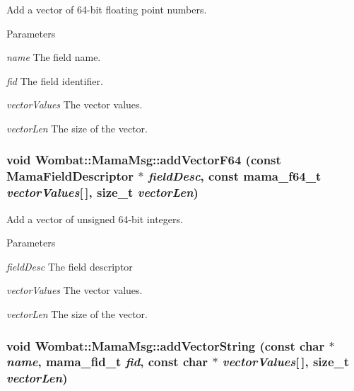 Add a vector of 64-\/bit floating point numbers. 
\begin{DoxyParams}{Parameters}
\item[{\em name}]The field name. \item[{\em fid}]The field identifier. \item[{\em vectorValues}]The vector values. \item[{\em vectorLen}]The size of the vector. \end{DoxyParams}
\hypertarget{classWombat_1_1MamaMsg_abe5aa90f4e89a99826528c5f11120455}{
\subsubsection[{addVectorF64}]{\setlength{\rightskip}{0pt plus 5cm}void Wombat::MamaMsg::addVectorF64 (const {\bf MamaFieldDescriptor} $\ast$ {\em fieldDesc}, \/  const mama\_\-f64\_\-t {\em vectorValues}\mbox{[}$\,$\mbox{]}, \/  size\_\-t {\em vectorLen})}}
\label{classWombat_1_1MamaMsg_abe5aa90f4e89a99826528c5f11120455}


Add a vector of unsigned 64-\/bit integers. 
\begin{DoxyParams}{Parameters}
\item[{\em fieldDesc}]The field descriptor \item[{\em vectorValues}]The vector values. \item[{\em vectorLen}]The size of the vector. \end{DoxyParams}
\hypertarget{classWombat_1_1MamaMsg_a1d1b50cbac49d0af7520223b1e23e099}{
\subsubsection[{addVectorString}]{\setlength{\rightskip}{0pt plus 5cm}void Wombat::MamaMsg::addVectorString (const char $\ast$ {\em name}, \/  mama\_\-fid\_\-t {\em fid}, \/  const char $\ast$ {\em vectorValues}\mbox{[}$\,$\mbox{]}, \/  size\_\-t {\em vectorLen})}}
\label{classWombat_1_1MamaMsg_a1d1b50cbac49d0af7520223b1e23e099}


